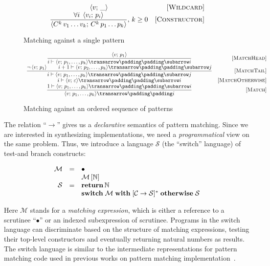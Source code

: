 \begin{figure}
   \renewcommand*{\arraystretch}{2}
   \[
   \begin{array}{cr}
     \left<{v;\,\_}\right> & \mbox{[\textsc{Wildcard}]} \\
     \dfrac{\forall i\;\left<{v_i;\,p_i}\right>}{\left<{C^k\,v_1\dots v_k;\,C^k\,p_1\dots p_k}\right>},\,k\ge 0 & \mbox{[\textsc{Constructor}]}
   \end{array}
   \]
   \caption{Matching against a single pattern}
   \label{fig:match1pat}
\end{figure}

\begin{figure}
   \renewcommand*{\arraystretch}{3}
   \setarrow{\xrightarrow}
   \setsubarrow{_*}
   \[
   \begin{array}{cr}
     \trule{\inbr{v;\,p_1}}
           {\withenv{i}{\trans{\inbr{v;\,p_1,\dots,p_k}}{}{i}}} & \ruleno{MatchHead}\\
     \trule{\neg\inbr{v;\,p_1}\qquad\withenv{i+1}{\trans{\inbr{v;\,p_2,\dots,p_k}}{}{j}}}
           {\withenv{i}{\trans{\inbr{v;\,p_1,\dots,p_k}}{}{j}}} & \ruleno{MatchTail}\\
     \withenv{i}{\trans{\inbr{v;\,\varepsilon}}{}{i}} & \ruleno{MatchOtherwise}\\
     \trule{\withenv{1}{\trans{\inbr{v;\,p_1,\dots,p_k}}{}{i}}}
           {\setsubarrow{}\trans{\inbr{v;\,p_1,\dots,p_k}}{}{i}} & \ruleno{Match}
   \end{array}
   \]
   \caption{Matching against an ordered sequence of patterns}
   \label{fig:matchpatts}
\end{figure}

The relation ``$\xrightarrow{}{}\!\!$'' gives us a \emph{declarative} semantics of pattern matching. Since we are interested in
synthesizing implementations, we need a \emph{programmatical} view on the same problem. Thus, we introduce a language $\mathcal S$
(the ``switch'' language) of test-and branch constructs:

\[
\begin{array}{rcl}
  \mathcal M & = & \bullet \\
  &   & \mathcal M\,[\mathbb{N}] \\
  \mathcal{S} & = & \mathbf{return}\,\mathbb{N} \\
  &   & \mathbf{switch}\;\mathcal{M}\;\mathbf{with}\; [\mathcal{C}\; \mathbf{\rightarrow}\; \mathcal{S}]^*\;\mathbf{otherwise}\;\mathcal{S}
\end{array}
\]
 
Here $\mathcal{M}$ stands for a \emph{matching expression}, which is either a reference to a scrutinee ``$\bullet$'' or
an indexed subexpression of scrutinee. Programs in the switch language can discriminate based on the
structure of matching expressions, testing their top-level constructors and eventually returning natural numbers as results.
The switch language is similar to the intermediate representations for pattern matching code used in 
previous works on pattern matching implementation~\cite{maranget2001,maranget2008}.


